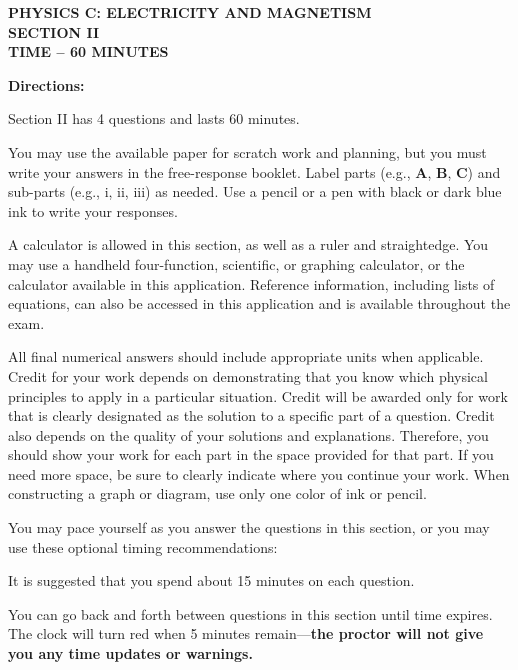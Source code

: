 \documentclass[12pt]{../../oss-apphys-exam}
\begin{document}
\begin{center}
  {\Large\textbf{PHYSICS C: ELECTRICITY AND MAGNETISM\\
      SECTION II\\
      TIME -- 60 MINUTES
    }
  }
\end{center}

\vspace{2in}
\textbf{Directions:}

Section II has 4 questions and lasts 60 minutes.

You may use the available paper for scratch work and planning, but you must
write your answers in the free-response booklet. Label parts (e.g., \textbf{A},
\textbf{B}, \textbf{C}) and sub-parts (e.g., i, ii, iii) as needed. Use a
pencil or a pen with black or dark blue ink to write your responses.

A calculator is allowed in this section, as well as a ruler and straightedge.
You may use a handheld four-function, scientific, or graphing calculator, or
the calculator available in this application. Reference information, including
lists of equations, can also be accessed in this application and is available
throughout the exam.

All final numerical answers should include appropriate units when applicable.
Credit for your work depends on demonstrating that you know which physical
principles to apply in a particular situation. Credit will be awarded only for
work that is clearly designated as the solution to a specific part of a
question. Credit also depends on the quality of your solutions and explanations.
Therefore, you should show your work for each part in the space provided for
that part. If you need more space, be sure to clearly indicate where you
continue your work. When constructing a graph or diagram, use only one color of
ink or pencil.

You may pace yourself as you answer the questions in this section, or you may
use these optional timing recommendations:

It is suggested that you spend about 15 minutes on each question.

You can go back and forth between questions in this section until time expires.
The clock will turn red when 5 minutes remain---\textbf{the proctor will not
  give you any time updates or warnings.}
\newpage
\end{document}

